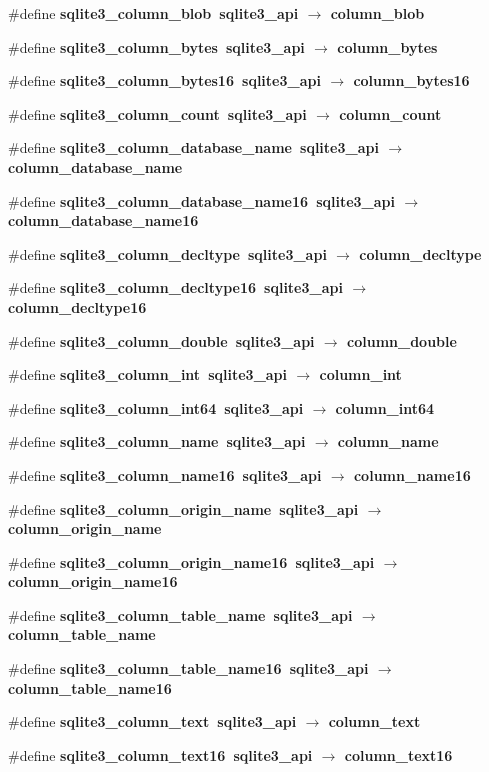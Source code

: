 \begin{CompactItemize}
\item 
\#define \bf{sqlite3\_\-column\_\-blob}~sqlite3\_\-api $\rightarrow$ column\_\-blob
\item 
\#define \bf{sqlite3\_\-column\_\-bytes}~sqlite3\_\-api $\rightarrow$ column\_\-bytes
\item 
\#define \bf{sqlite3\_\-column\_\-bytes16}~sqlite3\_\-api $\rightarrow$ column\_\-bytes16
\item 
\#define \bf{sqlite3\_\-column\_\-count}~sqlite3\_\-api $\rightarrow$ column\_\-count
\item 
\#define \bf{sqlite3\_\-column\_\-database\_\-name}~sqlite3\_\-api $\rightarrow$ column\_\-database\_\-name
\item 
\#define \bf{sqlite3\_\-column\_\-database\_\-name16}~sqlite3\_\-api $\rightarrow$ column\_\-database\_\-name16
\item 
\#define \bf{sqlite3\_\-column\_\-decltype}~sqlite3\_\-api $\rightarrow$ column\_\-decltype
\item 
\#define \bf{sqlite3\_\-column\_\-decltype16}~sqlite3\_\-api $\rightarrow$ column\_\-decltype16
\item 
\#define \bf{sqlite3\_\-column\_\-double}~sqlite3\_\-api $\rightarrow$ column\_\-double
\item 
\#define \bf{sqlite3\_\-column\_\-int}~sqlite3\_\-api $\rightarrow$ column\_\-int
\item 
\#define \bf{sqlite3\_\-column\_\-int64}~sqlite3\_\-api $\rightarrow$ column\_\-int64
\item 
\#define \bf{sqlite3\_\-column\_\-name}~sqlite3\_\-api $\rightarrow$ column\_\-name
\item 
\#define \bf{sqlite3\_\-column\_\-name16}~sqlite3\_\-api $\rightarrow$ column\_\-name16
\item 
\#define \bf{sqlite3\_\-column\_\-origin\_\-name}~sqlite3\_\-api $\rightarrow$ column\_\-origin\_\-name
\item 
\#define \bf{sqlite3\_\-column\_\-origin\_\-name16}~sqlite3\_\-api $\rightarrow$ column\_\-origin\_\-name16
\item 
\#define \bf{sqlite3\_\-column\_\-table\_\-name}~sqlite3\_\-api $\rightarrow$ column\_\-table\_\-name
\item 
\#define \bf{sqlite3\_\-column\_\-table\_\-name16}~sqlite3\_\-api $\rightarrow$ column\_\-table\_\-name16
\item 
\#define \bf{sqlite3\_\-column\_\-text}~sqlite3\_\-api $\rightarrow$ column\_\-text
\item 
\#define \bf{sqlite3\_\-column\_\-text16}~sqlite3\_\-api $\rightarrow$ column\_\-text16

\end{CompactItemize}
